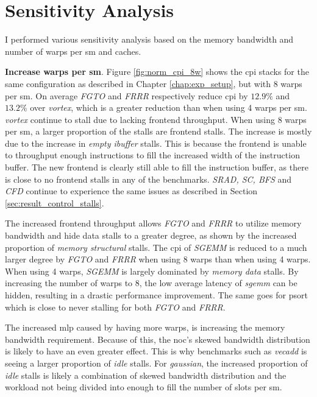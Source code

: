 \section{Sensitivity Analysis}

I performed various sensitivity analysis based on the memory bandwidth and number of warps per \acrshort{sm} and caches. 

\vspace{1mm}\noindent
\textbf{Increase warps per \acrshort{sm}}. Figure \ref{fig:norm_cpi_8w} shows the \acrshort{cpi} stacks for the same configuration as described in Chapter \ref{chap:exp_setup}, but with 8 warps per \acrshort{sm}. On average \textit{FGTO} and \textit{FRRR} respectively reduce \acrshort{cpi} by $12.9\%$ and $13.2\%$ over \textit{\Gls{vortex}}, which is a greater reduction than when using 4 warps per \acrshort{sm}. \textit{\Gls{vortex}} continue to stall due to lacking frontend throughput. When using 8 warps per \acrshort{sm}, a larger proportion of the stalls are frontend stalls. The increase is mostly due to the increase in \textit{empty ibuffer} stalls. This is because the frontend is unable to throughput enough instructions to fill the increased width of the instruction buffer. The new frontend is clearly still able to fill the instruction buffer, as there is close to no frontend stalls in any of the benchmarks. \textit{SRAD, SC, BFS} and \textit{CFD} continue to experience the same issues as described in Section \ref{sec:result_control_stalls}. 

The increased frontend throughput allows \textit{FGTO} and \textit{FRRR} to utilize memory bandwidth and hide data stalls to a greater degree, as shown by the increased proportion of \textit{memory structural} stalls. The \acrshort{cpi} of \textit{SGEMM} is reduced to a much larger degree by \textit{FGTO} and \textit{FRRR} when using 8 warps than when using 4 warps. When using 4 warps, \textit{SGEMM} is largely dominated by \textit{memory data} stalls. By increasing the number of warps to 8, the low average latency of \textit{sgemm} can be hidden, resulting in a drastic performance improvement. The same goes for psort which is close to never stalling for both \textit{FGTO} and \textit{FRRR}.

The increased \acrshort{mlp} caused by having more warps, is increasing the memory bandwidth requirement. Because of this, the \acrshort{noc}'s skewed bandwidth distribution is likely to have an even greater effect. This is why benchmarks such as \textit{vecadd} is seeing a larger proportion of \textit{idle} stalls. For \textit{gaussian}, the increased proportion of \textit{idle} stalls is likely a combination of skewed bandwidth distribution and the workload not being divided into enough  to fill the number of slots per \acrshort{sm}.   

